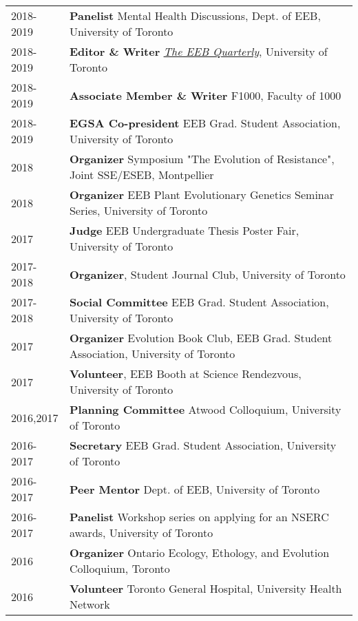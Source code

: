 \documentclass[12pt]{article}
\begin{document}
\begin{tabular}{ll}
2018-2019 & \textbf{Panelist} Mental Health Discussions, Dept. of EEB, University of Toronto \\
2018-2019 & \textbf{Editor \& Writer} \href{https://theeebquarterly.github.io/}{\textit{The EEB Quarterly}}, University of Toronto \\
2018-2019 & \textbf{Associate Member \& Writer} F1000, Faculty of 1000 \\
2018-2019 & \textbf{EGSA Co-president} EEB Grad. Student Association, University of Toronto \\
2018 & \textbf{Organizer} Symposium "The Evolution of Resistance", Joint SSE/ESEB, Montpellier \\
2018 & \textbf{Organizer} EEB Plant Evolutionary Genetics Seminar Series, University of Toronto \\
2017 & \textbf{Judge} EEB Undergraduate Thesis Poster Fair, University of Toronto \\
2017-2018 & \textbf{Organizer}, Student Journal Club, University of Toronto \\
2017-2018 & \textbf{Social Committee} EEB Grad. Student Association, University of Toronto \\
2017 & \textbf{Organizer} Evolution Book Club, EEB Grad. Student Association, University of Toronto \\
2017 & \textbf{Volunteer}, EEB Booth at Science Rendezvous, University of Toronto \\
2016,2017 & \textbf{Planning Committee} Atwood Colloquium, University of Toronto \\
2016-2017 & \textbf{Secretary} EEB Grad. Student Association, University of Toronto \\
2016-2017 & \textbf{Peer Mentor} Dept. of EEB, University of Toronto \\
2016-2017 & \textbf{Panelist} Workshop series on applying for an NSERC awards, University of Toronto \\
2016 & \textbf{Organizer} Ontario Ecology, Ethology, and Evolution Colloquium, Toronto \\
2016 & \textbf{Volunteer} Toronto General Hospital, University Health Network \\


\end{tabular}


\end{document}
